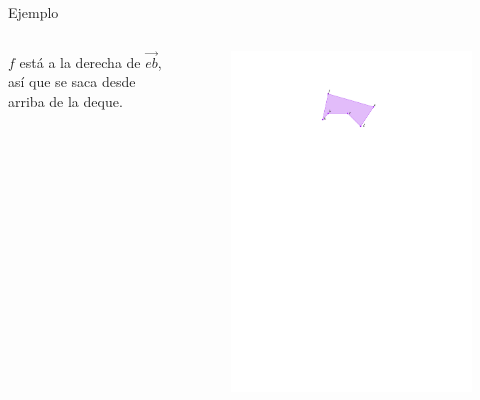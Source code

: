 \documentclass[aspectratio=169,xcolor=dvipsnames, t]{beamer}
\begin{document}
\begin{frame}{Ejemplo}
  \begin{columns}
    \begin{column}{0.5\textwidth}
      $f$ está a la derecha de $\overrightarrow{eb}$, así que se saca desde arriba de la deque.
    \end{column}
    \begin{column}{0.5\textwidth}
      \begin{figure}
        \centering
        \includegraphics[width=\linewidth, height=0.5\textheight, page=11, keepaspectratio]{IPE/Melkman.pdf}
      \end{figure}
    \end{column}
  \end{columns}
\end{frame}
\end{document}
